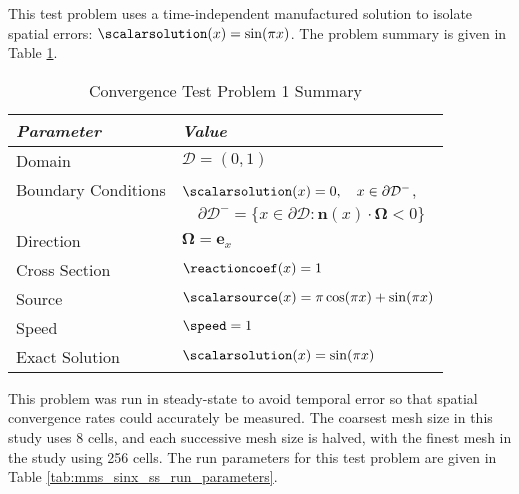 This test problem uses a time-independent manufactured solution to isolate
spatial errors: $\scalarsolution(x)=\sin(\pi x)$. The problem summary is
given in Table \ref{tab:mms_sinx_ss}.

\begin{table}[htb]\caption{Convergence Test Problem 1 Summary}
\label{tab:mms_sinx_ss}
\centering
\begin{tabular}{l l}\toprule
\emph{Parameter} & \emph{Value}\\\midrule
Domain & $\mathcal{D} = (0,1)$\\
Boundary Conditions & $\scalarsolution(x)=0,\quad x\in\partial\mathcal{D}^-$,\\
   & $\quad\partial\mathcal{D}^-=\{x\in\partial\mathcal{D}:\mathbf{n}(x)
       \cdot\mathbf{\Omega}<0\}$\\
Direction & $\mathbf{\Omega} = \mathbf{e}_x$\\
Cross Section & $\reactioncoef(x)=1$\\
Source & $\scalarsource(x)=\pi\cos(\pi x) + \sin(\pi x)$\\
Speed & $\speed=1$\\
Exact Solution & $\scalarsolution(x)=\sin(\pi x)$\\
\bottomrule\end{tabular}
\end{table}

This problem was run in steady-state to avoid temporal error so that spatial
convergence rates could accurately be measured.
The coarsest mesh size in this study uses 8 cells, and each successive mesh
size is halved, with the finest mesh in the study using 256 cells.
The run parameters for this test problem are given in Table
\ref{tab:mms_sinx_ss_run_parameters}.


